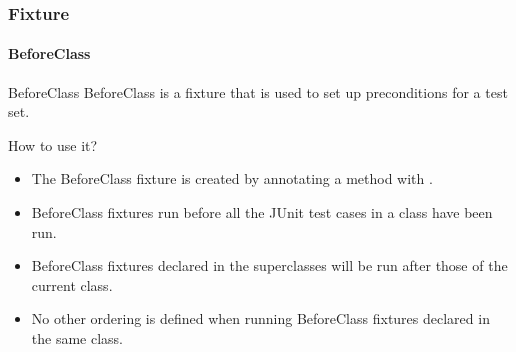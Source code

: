 \begin{frame}[parent={concept:fixture}, hasprev=false, hasnext=false]
\frametitle{Fixture}
\framesubtitle{BeforeClass}
\label{concept:junit-beforeclass-fixture}
\label{concept:beforeclass-fixture}
\label{concept:beforeclass}

\begin{block:concept}{BeforeClass}
BeforeClass is a fixture that is used to set up preconditions for a
test set.
\end{block:concept}


\begin{block:fact}{How to use it?}
\begin{itemize}
	\item The BeforeClass fixture is created by annotating a method with
	.

	\item BeforeClass fixtures run before all the JUnit test cases in a class
	have been run.

	\item BeforeClass fixtures declared in the superclasses will be run after
	those of the current class.

	\item No other ordering is defined when running BeforeClass fixtures
	declared in the same class.
\end{itemize}
\end{block:fact}
\end{frame}